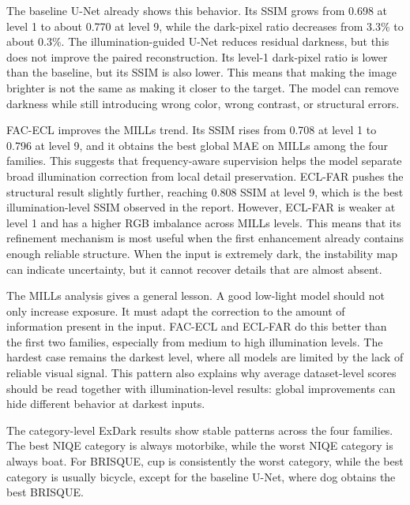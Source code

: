 

The baseline U-Net already shows this behavior. Its SSIM grows from 0.698 at level 1 to about 0.770 at level 9, while the dark-pixel ratio decreases from 3.3\% to about 0.3\%. The illumination-guided U-Net reduces residual darkness, but this does not improve the paired reconstruction. Its level-1 dark-pixel ratio is lower than the baseline, but its SSIM is also lower. This means that making the image brighter is not the same as making it closer to the target. The model can remove darkness while still introducing wrong color, wrong contrast, or structural errors.

FAC-ECL improves the MILLs trend. Its SSIM rises from 0.708 at level 1 to 0.796 at level 9, and it obtains the best global MAE on MILLs among the four families. This suggests that frequency-aware supervision helps the model separate broad illumination correction from local detail preservation. ECL-FAR pushes the structural result slightly further, reaching 0.808 SSIM at level 9, which is the best illumination-level SSIM observed in the report. However, ECL-FAR is weaker at level 1 and has a higher RGB imbalance across MILLs levels. This means that its refinement mechanism is most useful when the first enhancement already contains enough reliable structure. When the input is extremely dark, the instability map can indicate uncertainty, but it cannot recover details that are almost absent.

The MILLs analysis gives a general lesson. A good low-light model should not only increase exposure. It must adapt the correction to the amount of information present in the input. FAC-ECL and ECL-FAR do this better than the first two families, especially from medium to high illumination levels. The hardest case remains the darkest level, where all models are limited by the lack of reliable visual signal. This pattern also explains why average dataset-level scores should be read together with illumination-level results: global improvements can hide different behavior at darkest inputs.

The category-level ExDark results show stable patterns across the four families. The best NIQE category is always motorbike, while the worst NIQE category is always boat. For BRISQUE, cup is consistently the worst category, while the best category is usually bicycle, except for the baseline U-Net, where dog obtains the best BRISQUE.

